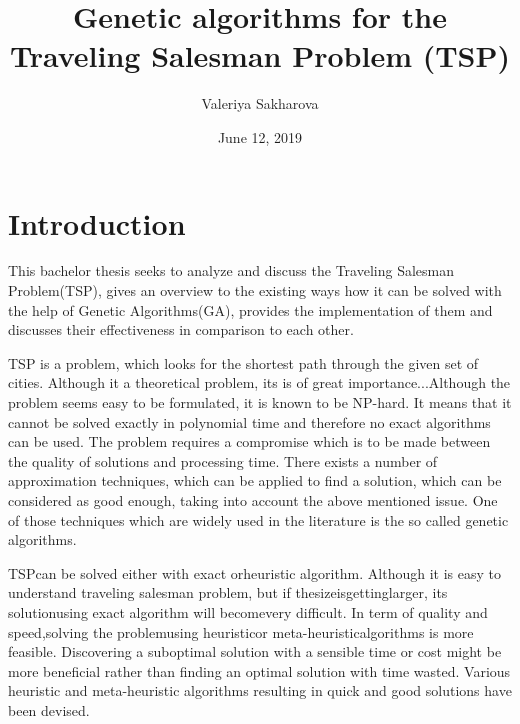 \documentclass[a4paper, 12pt, headings=standardclasses]{scrartcl}
\begin{document}
	\subject{\large{Bachelorarbeit}}
	\title{\LARGE{Genetic algorithms for the Traveling Salesman Problem (TSP)}}
	\author{Valeriya Sakharova}
	\date{June 12, 2019}
	
	\begin{titlepage}
		\maketitle
		\thispagestyle{empty}
	\end{titlepage}


\tableofcontents
\newpage

\section{Introduction}
\label{sec:introduction}
	 This bachelor thesis seeks to analyze and discuss the Traveling Salesman Problem(TSP), gives an overview to the existing ways how it can be solved with the help of Genetic Algorithms(GA), provides the implementation of them and discusses their effectiveness in comparison to each other. \par 
	 TSP is a problem, which looks for the shortest path through the given set of cities. Although it a theoretical problem, its is of great importance...Although the problem seems easy to be formulated, it is known to be NP-hard. It means that it cannot be solved exactly in polynomial time and therefore no exact algorithms can be used. The problem requires a compromise which is to be made between the quality of solutions and processing time. There exists a number of  approximation techniques, which can be applied to find a solution, which can be considered as good enough, taking into account the above mentioned issue. One of those techniques which are widely used in the literature is the so called genetic algorithms.\par
	 
	 TSPcan be solved either with exact orheuristic algorithm. Although it is easy to understand traveling salesman problem, but if thesizeisgettinglarger, its solutionusing exact algorithm will becomevery difficult. In term of quality and speed,solving the problemusing heuristicor meta-heuristicalgorithms is more feasible. Discovering a suboptimal solution with a sensible time or cost might be more beneficial rather than finding an optimal solution with time wasted. Various heuristic and meta-heuristic algorithms resulting in quick and good solutions have been devised.
	 
\end{document}

